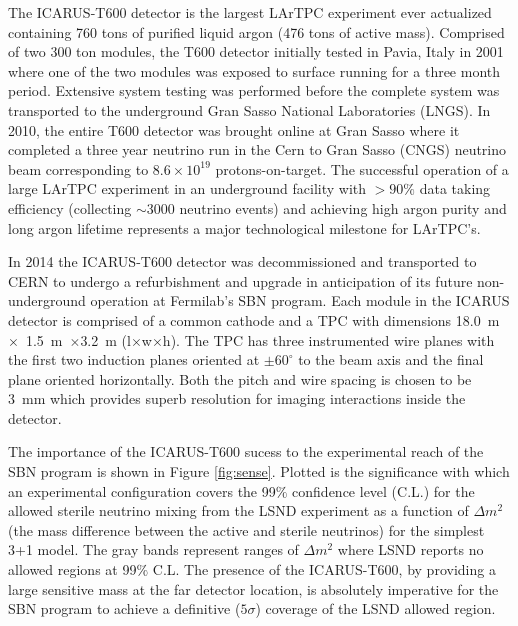 \label{sec:IF_ICARUS}
The ICARUS-T600 detector is the largest LArTPC experiment ever actualized containing 760 tons of purified liquid argon (476 tons of active mass). Comprised of two 300 ton modules, the T600 detector initially tested in Pavia, Italy in 2001 where one of the two modules was exposed to surface running for a three month period. Extensive system testing was performed before the complete system was transported to the underground Gran Sasso National Laboratories (LNGS). In 2010, the entire T600 detector was brought online at Gran Sasso where it completed a three year neutrino run in the Cern to Gran Sasso (CNGS) neutrino beam corresponding to $8.6 \times 10^{19}$ protons-on-target. The successful operation of a large LArTPC experiment in an underground facility with $>90\%$ data taking efficiency (collecting $\sim$3000 neutrino events) and achieving high argon purity and long argon lifetime represents a major technological milestone for LArTPC's.

In 2014 the ICARUS-T600 detector was decommissioned and transported to CERN to undergo a refurbishment and upgrade in anticipation of its future non-underground operation at Fermilab's SBN program. Each module in the ICARUS detector is comprised of a common cathode and a TPC with dimensions 18.0~m~$\times$~1.5~m~$\times$3.2~m (l$\times$w$\times$h). The TPC has three instrumented wire planes with the first two induction planes oriented at $\pm 60^{\circ}$ to the beam axis and the final plane oriented horizontally. Both the pitch and wire spacing is chosen to be 3~mm which provides superb resolution for imaging interactions inside the detector. 


The importance of the ICARUS-T600 sucess to the experimental reach of the SBN program is shown in Figure \ref{fig:sense}. Plotted is the significance with which an experimental configuration covers the 99$\%$ confidence level (C.L.) for the allowed sterile neutrino mixing from the LSND experiment as a function of $\Delta m^{2}$ (the mass difference between the active and sterile neutrinos) for the simplest 3+1 model. The gray bands represent ranges of $\Delta m^{2}$ where LSND reports no allowed regions at 99$\%$ C.L. The presence of the ICARUS-T600, by providing a large sensitive mass at the far detector location, is absolutely imperative for the SBN program to achieve a definitive ($5\sigma$) coverage of the LSND allowed region.

